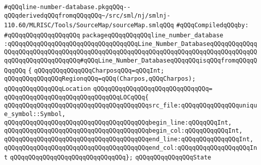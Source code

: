 \label{src/lib/compiler/back/low/tools/line-number-db/line-number-database.pkg}
\verb|#qQQqline-number-database.pkgqQQq--qQQqderivedqQQqfromqQQqqQQq~/src/sml/nj/smlnj-110.60/MLRISC/Tools/SourceMap/sourceMap.smlqQQq|\newline
\newline
\verb|#qQQqCompiledqQQqby:|\newline
\verb|#qQQqqQQqqQQqqQQqqQQq|\newline
\newline
\verb|packageqQQqqQQqqQQqline_number_database|\newline
\verb|:qQQqqQQqqQQqqQQqqQQqqQQqqQQqqQQqqQQqLine_Number_DatabaseqQQqqQQqqQQqqQQqqQQqqQQqqQQqqQQqqQQqqQQqqQQqqQQqqQQqqQQqqQQqqQQqqQQqqQQqqQQqqQQqqQQqqQQqqQQqqQQqqQQqqQQq#qQQqLine_Number_DatabaseqQQqqQQqisqQQqfromqQQqqQQqqQQq|\newline
\verb|{|\newline
\verb|qQQqqQQqqQQqqQQqCharposqQQq=qQQqInt;|\newline
\newline
\verb|qQQqqQQqqQQqqQQqRegionqQQq=qQQq(Charpos,qQQqCharpos);|\newline
\newline
\verb|qQQqqQQqqQQqqQQqLocation|\newline
\verb|qQQqqQQqqQQqqQQqqQQqqQQqqQQqqQQq=|\newline
\verb|qQQqqQQqqQQqqQQqqQQqqQQqqQQqqQQqLOCqQQq{|\newline
\verb|qQQqqQQqqQQqqQQqqQQqqQQqqQQqqQQqqQQqqQQqsrc_file:qQQqqQQqqQQqqQQqunique_symbol::Symbol,|\newline
\verb|qQQqqQQqqQQqqQQqqQQqqQQqqQQqqQQqqQQqqQQqbegin_line:qQQqqQQqInt,|\newline
\verb|qQQqqQQqqQQqqQQqqQQqqQQqqQQqqQQqqQQqqQQqbegin_col:qQQqqQQqqQQqInt,|\newline
\verb|qQQqqQQqqQQqqQQqqQQqqQQqqQQqqQQqqQQqqQQqend_line:qQQqqQQqqQQqqQQqInt,|\newline
\verb|qQQqqQQqqQQqqQQqqQQqqQQqqQQqqQQqqQQqqQQqend_col:qQQqqQQqqQQqqQQqqQQqInt|\newline
\verb|qQQqqQQqqQQqqQQqqQQqqQQqqQQqqQQq};|\newline
\newline
\verb|qQQqqQQqqQQqqQQqState|\newline
